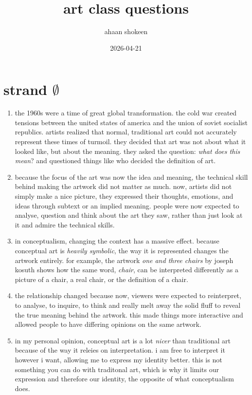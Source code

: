 \documentclass{article}
\title{art class questions}
\author{ahaan shokeen}
\date{2026-04-21}
\begin{document}
  \maketitle

  \section{strand \( \emptyset \)}

  \begin{enumerate}

    \item the 1960s were a time of great global transformation. the cold war created tensions between the united states of america and the union of soviet socialist republics. artists realized that normal, traditional art could not accurately represent these times of turmoil. they decided that art was not about what it looked like, but about the meaning. they asked the question: \emph{what does this mean}? and questioned things like who decided the definition of art.
    \item because the focus of the art was now the idea and meaning, the technical skill behind making the artwork did not matter as much. now, artists did not simply make a nice picture, they expressed  their thoughts, emotions, and ideas through subtext or an implied meaning. people were now expected to analyse, question and think about the art they saw, rather than just look at it and admire the technical skills.
    \item in conceptualism, changing the context has a massive effect. because conceptual art is \emph{heavily symbolic}, the way it is represented changes the artwork entirely. for example, the artwork \emph{one and three chairs} by joseph kosuth shows how the same word, \emph{chair}, can be interpreted differently as a picture of a chair, a real chair, or the definition of a chair.
    \item the relationship changed because now, viewers were expected to reinterpret, to analyse, to inquire, to think and really melt away the solid fluff to reveal the true meaning behind the artwork. this made things more interactive and allowed people to have differing opinions on the same artwork.
    \item in my personal opinion, conceptual art is a lot \emph{nicer} than traditional art because of the way it releies on interpretation. i am free to interpret it however i want, allowing me to express my identity better. this is not something you can do with traditonal art, which is why it limits our expression and therefore our identity, the opposite of what conceptualism does.
  \end{enumerate}
\end{document}
